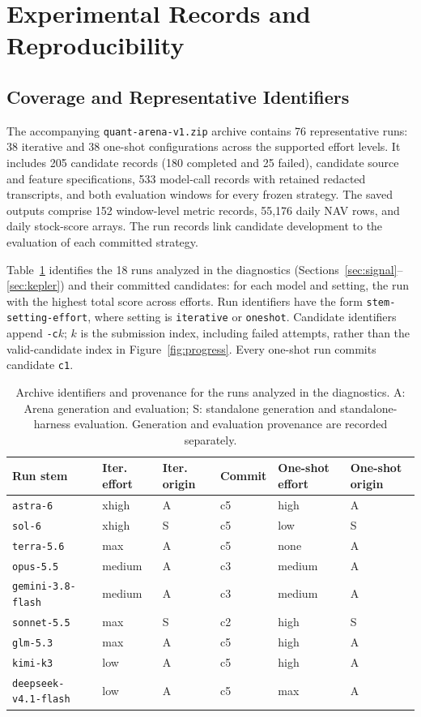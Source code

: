 \section{Experimental Records and Reproducibility}
\label{app:artifacts}

\subsection{Coverage and Representative Identifiers}

The accompanying \texttt{quant-arena-v1.zip} archive contains 76 representative runs: 38 iterative and 38 one-shot configurations across the supported effort levels. It includes 205 candidate records (180 completed and 25 failed), candidate source and feature specifications, 533 model-call records with retained redacted transcripts, and both evaluation windows for every frozen strategy. The saved outputs comprise 152 window-level metric records, 55,176 daily NAV rows, and daily stock-score arrays. The run records link candidate development to the evaluation of each committed strategy.

Table~\ref{tab:artifact_ids} identifies the 18 runs analyzed in the diagnostics (Sections~\ref{sec:signal}--\ref{sec:kepler}) and their committed candidates: for each model and setting, the run with the highest total score across efforts. Run identifiers have the form \texttt{stem-setting-effort}, where setting is \texttt{iterative} or \texttt{oneshot}. Candidate identifiers append \texttt{-c}$k$; $k$ is the submission index, including failed attempts, rather than the valid-candidate index in Figure~\ref{fig:progress}. Every one-shot run commits candidate \texttt{c1}.

\begin{table}[H]
\centering\small
\caption{Archive identifiers and provenance for the runs analyzed in the diagnostics. A: Arena generation and evaluation; S: standalone generation and standalone-harness evaluation. Generation and evaluation provenance are recorded separately.}
\label{tab:artifact_ids}
\setlength{\tabcolsep}{5pt}
\begin{tabular}{@{}llllll@{}}
\toprule
Run stem & Iter. effort & Iter. origin & Commit & One-shot effort & One-shot origin \\
\midrule
\texttt{astra-6} & xhigh & A & c5 & high & A \\
\texttt{sol-6} & xhigh & S & c5 & low & S \\
\texttt{terra-5.6} & max & A & c5 & none & A \\
\texttt{opus-5.5} & medium & A & c3 & medium & A \\
\texttt{gemini-3.8-flash} & medium & A & c3 & medium & A \\
\texttt{sonnet-5.5} & max & S & c2 & high & S \\
\texttt{glm-5.3} & max & A & c5 & high & A \\
\texttt{kimi-k3} & low & A & c5 & high & A \\
\texttt{deepseek-v4.1-flash} & low & A & c5 & max & A \\
\bottomrule
\end{tabular}
\end{table}

